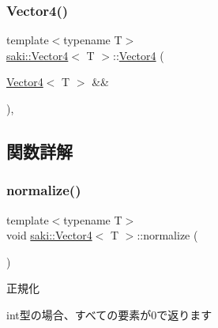 \mbox{\label{classsaki_1_1_vector4_afc0bf46f0fefeae2f6f21288f6714580}} 
\subsubsection{\texorpdfstring{Vector4()}{Vector4()}\hspace{0.1cm}{\footnotesize\ttfamily [5/5]}}
{\footnotesize\ttfamily template$<$typename T$>$ \\
\mbox{\hyperlink{classsaki_1_1_vector4}{saki\+::\+Vector4}}$<$ T $>$\+::\mbox{\hyperlink{classsaki_1_1_vector4}{Vector4}} (\begin{DoxyParamCaption}\item[{\mbox{\hyperlink{classsaki_1_1_vector4}{Vector4}}$<$ T $>$ \&\&}]{ }\end{DoxyParamCaption})\hspace{0.3cm}{\ttfamily [default]}, {\ttfamily [noexcept]}}



\subsection{関数詳解}
\mbox{\label{classsaki_1_1_vector4_a0dffdb9814b980692e096cfca3438665}} 
\subsubsection{\texorpdfstring{normalize()}{normalize()}}
{\footnotesize\ttfamily template$<$typename T$>$ \\
void \mbox{\hyperlink{classsaki_1_1_vector4}{saki\+::\+Vector4}}$<$ T $>$\+::normalize (\begin{DoxyParamCaption}{ }\end{DoxyParamCaption})\hspace{0.3cm}{\ttfamily [inline]}}



正規化 

int型の場合、すべての要素が0で返ります \mbox{\label{classsaki_1_1_vector4_a0d2783b04b8c25139339345eacedd2d6}} 
